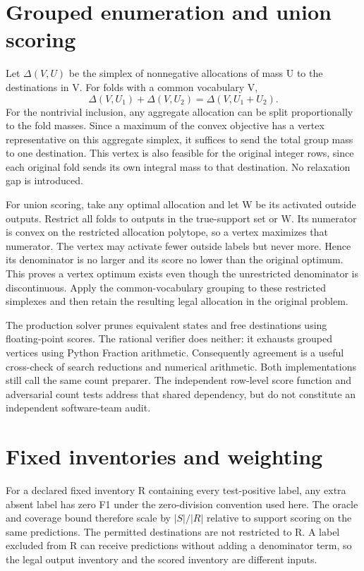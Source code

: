 \documentclass[onecolumn]{svjour3}
\begin{document}
\section{Grouped enumeration and union scoring}
Let $\Delta(V,U)$ be the simplex of nonnegative allocations of mass U to the destinations in V. For folds with a common vocabulary V,
\begin{equation}\Delta(V,U_1)+\Delta(V,U_2)=\Delta(V,U_1+U_2).\end{equation}
For the nontrivial inclusion, any aggregate allocation can be split proportionally to the fold masses. Since a maximum of the convex objective has a vertex representative on this aggregate simplex, it suffices to send the total group mass to one destination. This vertex is also feasible for the original integer rows, since each original fold sends its own integral mass to that destination. No relaxation gap is introduced.

For union scoring, take any optimal allocation and let W be its activated outside outputs. Restrict all folds to outputs in the true-support set or W. Its numerator is convex on the restricted allocation polytope, so a vertex maximizes that numerator. The vertex may activate fewer outside labels but never more. Hence its denominator is no larger and its score no lower than the original optimum. This proves a vertex optimum exists even though the unrestricted denominator is discontinuous. Apply the common-vocabulary grouping to these restricted simplexes and then retain the resulting legal allocation in the original problem.

The production solver prunes equivalent states and free destinations using floating-point scores. The rational verifier does neither: it exhausts grouped vertices using Python Fraction arithmetic. Consequently agreement is a useful cross-check of search reductions and numerical arithmetic. Both implementations still call the same count preparer. The independent row-level score function and adversarial count tests address that shared dependency, but do not constitute an independent software-team audit.

\section{Fixed inventories and weighting}
For a declared fixed inventory R containing every test-positive label, any extra absent label has zero F1 under the zero-division convention used here. The oracle and coverage bound therefore scale by $|S|/|R|$ relative to support scoring on the same predictions. The permitted destinations are not restricted to R. A label excluded from R can receive predictions without adding a denominator term, so the legal output inventory and the scored inventory are different inputs.
\end{document}
